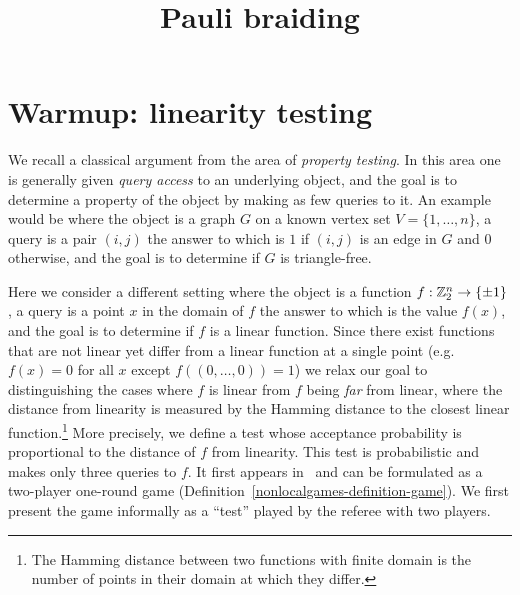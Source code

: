 




\title{Pauli braiding}
\label{paulibraiding}

\maketitle

\label{section-phantom}

\tableofcontents

\section{Warmup: linearity testing}
\label{section-linearity-testing}

We recall a classical argument from the area of \emph{property testing}. In this area one is generally given \emph{query access} to an underlying object, and the goal is to determine a property of the object by making as few queries to it. An example would be where the object is a graph $G$ on a known vertex set $V = \{1,\ldots, n\}$, a query is a pair $(i,j)$ the answer to which is $1$ if $(i,j)$ is an edge in $G$ and $0$ otherwise, and the goal is to determine if $G$ is triangle-free. 

Here we consider a different setting where the object is a function $f:\mathbb{Z}_2^n\to\{\pm1 \}$, a query is a point $x$ in the domain of $f$ the answer to which is the value $f(x)$, and the goal is to determine if $f$ is a linear function. Since there exist functions that are not linear yet differ from a linear function at a single point (e.g.\ $f(x)=0$ for all $x$ except $f((0,\ldots,0))=1$) we relax our goal to distinguishing the cases where $f$ is linear from $f$ being \emph{far} from linear, where the distance from linearity is measured by the Hamming distance to the closest linear function.\footnote{The Hamming distance between two functions with finite domain is the number of points in their domain at which they differ.} More precisely, we define a test whose acceptance probability is proportional to the distance of $f$ from linearity. This test is probabilistic and makes only three queries to $f$. It first appears in~\cite{blum1993self} and can be formulated as a two-player one-round game (Definition~\ref{nonlocalgames-definition-game}). We first present the game informally as a ``test'' played by the referee with two players.  

